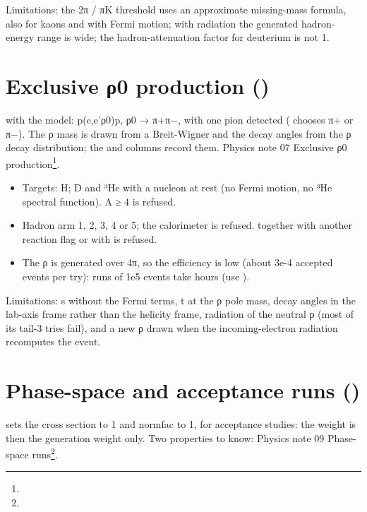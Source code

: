 Limitations: the 2π / πK threshold uses an approximate missing-mass formula, also for kaons and with Fermi motion; with
radiation the generated hadron-energy range is wide; the hadron-attenuation factor for deuterium is not 1.

\section{\texorpdfstring{Exclusive ρ0 production ()}{Exclusive ρ0 production (doing\_\allowbreak{}rho)}}\label{user_manual-05u5freactions:57-exclusive-u3c10-production-doingu5frho}
 with the  model: p(e,e'ρ0)p, ρ0 → π+π−, with one pion detected (\hyperref[param:doingu5fhplus]{} chooses π+ or π−). The ρ
mass is drawn from a Breit-Wigner and the decay angles from the ρ decay distribution; the  and  columns record
them.
Physics note 07 Exclusive ρ0 production\footnote{}.


\begin{itemize}
\item Targets: H; D and ³He with a nucleon at rest (no Fermi motion, no ³He spectral function). A ≥ 4 is refused.
\item Hadron arm 1, 2, 3, 4 or 5; the calorimeter is refused. \hyperref[param:doingu5frho]{} together with another reaction flag or with
\hyperref[param:doingu5fpizero]{} is refused.
\item The ρ is generated over 4π, so the efficiency is low (about 3e-4 accepted events per try): runs of 1e5 events take hours
(use ).
\end{itemize}
Limitations: s without the Fermi terms, t at the ρ pole mass, decay angles in the lab-axis frame rather than the helicity
frame, radiation of the neutral ρ (most of its tail-3 tries fail), and a new ρ drawn when the incoming-electron radiation
recomputes the event.

\section{\texorpdfstring{Phase-space and acceptance runs ()}{Phase-space and acceptance runs (doing\_\allowbreak{}phsp)}}\label{user_manual-05u5freactions:58-phase-space-and-acceptance-runs-doingu5fphsp}
 sets the cross section to 1 and normfac to 1, for acceptance studies: the weight is then the generation
weight only. Two properties to know:
Physics note 09 Phase-space runs\footnote{}.


